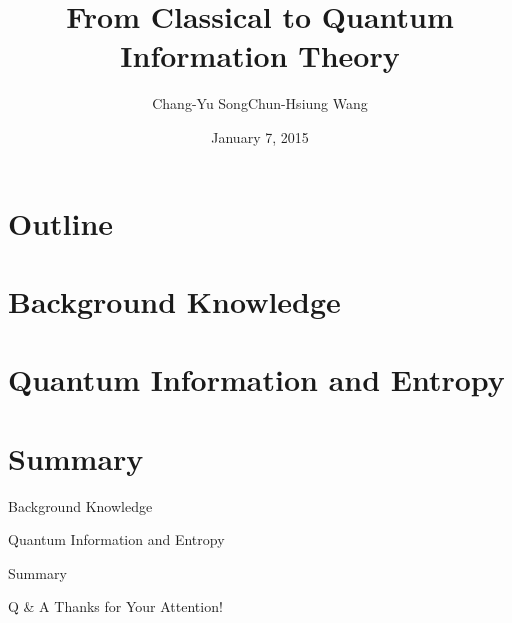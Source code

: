 \documentclass[xcolor=svgnames,handout]{beamer}
\title
  [From classical to quantum information theory\hspace{2em}]
  {From Classical to Quantum Information Theory}
\author
  []
  {Chang-Yu Song\quad Chun-Hsiung Wang}
\date
  {January 7, 2015}
\institute
  {Graduate Institute of Communication Engineering \\
   National Taiwan University}
\begin{document}
\maketitle

\section{Outline}


\section{Background Knowledge}


%



\section{Quantum Information and Entropy}





%
%


%











\section{Summary}
\begin{frame}{}
\begin{itemize}
  {\color{gray}\item Background Knowledge\pause
  \item Quantum Information and Entropy\pause}
  \item Summary\pause
\end{itemize}
\end{frame}


\begin{frame}{Q \& A}
  Thanks for Your Attention!
\end{frame}
\end{document}
